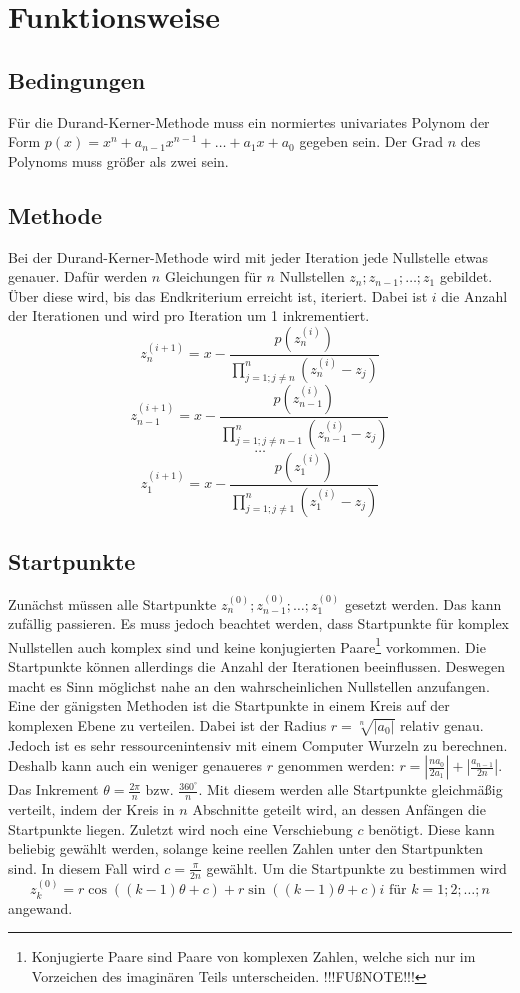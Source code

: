 \documentclass[12pt]{article}
\begin{document}
\section{Funktionsweise}
\subsection{Bedingungen}
Für die Durand-Kerner-Methode muss ein normiertes univariates Polynom der Form $p(x) = x^n + a_{n-1} x^{n-1} + \dots + a_1 x + a_0$ gegeben sein. Der Grad $n$ des Polynoms muss größer als zwei sein.

\subsection{Methode}
Bei der Durand-Kerner-Methode wird mit jeder Iteration jede Nullstelle etwas genauer. Dafür werden $n$ Gleichungen für $n$ Nullstellen $z_n;z_{n-1};\dots;z_1$ gebildet. Über diese wird, bis das Endkriterium erreicht ist, iteriert. Dabei ist $i$ die Anzahl der Iterationen und wird pro Iteration um 1 inkrementiert.
\[z_n^{(i+1)} = x - \frac{p(z_n^{(i)})}{\prod_{j=1;j\neq n}^{n}(z_n^{(i)}-z_j)}\]
\[z_{n-1}^{(i+1)} = x - \frac{p(z_{n-1}^{(i)})}{\prod_{j=1;j\neq n-1}^{n}(z_{n-1}^{(i)}-z_j)}\]
\vspace{0.25mm}
\[\dots\]
\[z_{1}^{(i+1)} = x - \frac{p(z_{1}^{(i)})}{\prod_{j=1;j\neq 1}^{n}(z_{1}^{(i)}-z_j)}\]
\subsection{Startpunkte}
Zunächst müssen alle Startpunkte $z_n^{(0)};z_{n-1}^{(0)};\dots;z_1^{(0)}$ gesetzt werden. Das kann zufällig passieren. Es muss jedoch beachtet werden, dass Startpunkte für komplex Nullstellen auch komplex sind und keine konjugierten Paare\footnote{Konjugierte Paare sind Paare von komplexen Zahlen, welche sich nur im Vorzeichen des imaginären Teils unterscheiden. !!!FUßNOTE!!!} vorkommen. Die Startpunkte können allerdings die Anzahl der Iterationen beeinflussen. Deswegen macht es Sinn möglichst nahe an den wahrscheinlichen Nullstellen anzufangen. Eine der gänigsten Methoden ist die Startpunkte in einem Kreis auf der komplexen Ebene zu verteilen. Dabei ist der Radius $r = \sqrt[n]{|a_0|}$ relativ genau. Jedoch ist es sehr ressourcenintensiv mit einem Computer Wurzeln zu berechnen. Deshalb kann auch ein weniger genaueres $r$ genommen werden: $r = |\frac{na_0}{2a_1}| + |\frac{a_{n-1}}{2n}|$.
Das Inkrement $\theta = \frac{2\pi}{n} \text{ bzw. } \frac{360^\circ}{n}$. Mit diesem werden alle Startpunkte gleichmäßig verteilt, indem der Kreis in $n$ Abschnitte geteilt wird, an dessen Anfängen die Startpunkte liegen. Zuletzt wird noch eine Verschiebung $c$ benötigt. Diese kann beliebig gewählt werden, solange keine reellen Zahlen unter den Startpunkten sind. In diesem Fall wird $c = \frac{\pi}{2n}$ gewählt.
Um die Startpunkte zu bestimmen wird 
\[z_{k}^{(0)} = r\cos((k-1)\theta+c)+r\sin((k-1)\theta+c)i \text{ für } k=1;2;\dots;n\]
 angewand.
\end{document}
